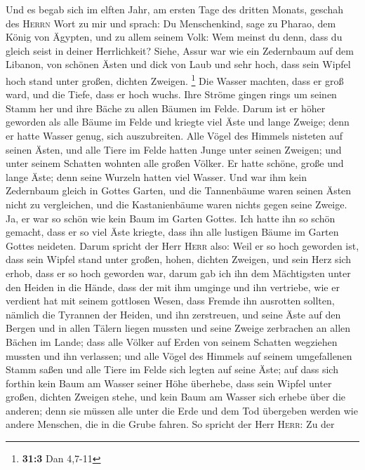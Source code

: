  Und es begab sich im elften Jahr, am ersten Tage des
dritten Monats, geschah des \textsc{Herrn} Wort zu mir und sprach:
 Du Menschenkind, sage zu Pharao, dem König von Ägypten,
und zu allem seinem Volk: Wem meinst du denn, dass du gleich seist in
deiner Herrlichkeit?  Siehe, Assur war wie ein Zedernbaum
auf dem Libanon, von schönen Ästen und dick von Laub und sehr hoch, dass
sein Wipfel hoch stand unter großen, dichten Zweigen. \footnote{\textbf{31:3}
  Dan 4,7-11}  Die Wasser machten, dass er groß ward, und
die Tiefe, dass er hoch wuchs. Ihre Ströme gingen rings um seinen Stamm
her und ihre Bäche zu allen Bäumen im Felde.  Darum ist er
höher geworden als alle Bäume im Felde und kriegte viel Äste und lange
Zweige; denn er hatte Wasser genug, sich auszubreiten. 
Alle Vögel des Himmels nisteten auf seinen Ästen, und alle Tiere im
Felde hatten Junge unter seinen Zweigen; und unter seinem Schatten
wohnten alle großen Völker.  Er hatte schöne, große und
lange Äste; denn seine Wurzeln hatten viel Wasser.  Und
war ihm kein Zedernbaum gleich in Gottes Garten, und die Tannenbäume
waren seinen Ästen nicht zu vergleichen, und die Kastanienbäume waren
nichts gegen seine Zweige. Ja, er war so schön wie kein Baum im Garten
Gottes.  Ich hatte ihn so schön gemacht, dass er so viel
Äste kriegte, dass ihn alle lustigen Bäume im Garten Gottes neideten.
 Darum spricht der Herr \textsc{Herr} also: Weil er so
hoch geworden ist, dass sein Wipfel stand unter großen, hohen, dichten
Zweigen, und sein Herz sich erhob, dass er so hoch geworden war,
 darum gab ich ihn dem Mächtigsten unter den Heiden in
die Hände, dass der mit ihm umginge und ihn vertriebe, wie er verdient
hat mit seinem gottlosen Wesen,  dass Fremde ihn
ausrotten sollten, nämlich die Tyrannen der Heiden, und ihn zerstreuen,
und seine Äste auf den Bergen und in allen Tälern liegen mussten und
seine Zweige zerbrachen an allen Bächen im Lande; dass alle Völker auf
Erden von seinem Schatten wegziehen mussten und ihn verlassen;
 und alle Vögel des Himmels auf seinem umgefallenen Stamm
saßen und alle Tiere im Felde sich legten auf seine Äste;
 auf dass sich forthin kein Baum am Wasser seiner Höhe
überhebe, dass sein Wipfel unter großen, dichten Zweigen stehe, und kein
Baum am Wasser sich erhebe über die anderen; denn sie müssen alle unter
die Erde und dem Tod übergeben werden wie andere Menschen, die in die
Grube fahren.  So spricht der Herr \textsc{Herr}: Zu der
